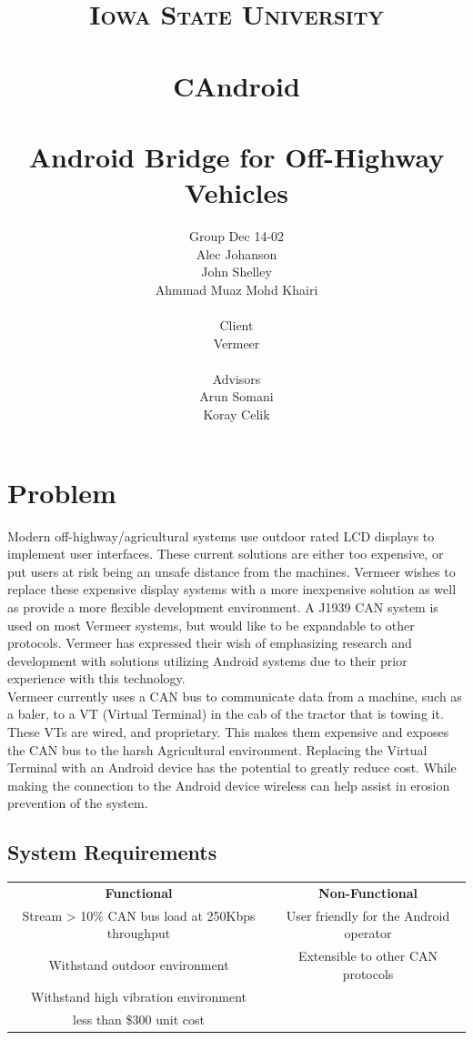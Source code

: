 \documentclass[paper=a4, fontsize=11pt]{scrartcl}
\title{
		\vspace{1in} 	
		\usefont{OT1}{bch}{b}{n}
		\normalfont \normalsize \textsc{Iowa State University} \\ [25pt]
		{\color{darkgreen}\horrule{1pt} \\[0.5cm]}
		\huge CAndroid \\
		{\color{darkgreen}\horrule{1pt} \\[0.5cm]}
		\large Android Bridge for Off-Highway Vehicles
		\vspace{1.25in}
}
\author{
		\normalfont 								\normalsize
		{\color{darkgreen} Group Dec 14-02}\\ \normalsize
        Alec Johanson\\[-3pt]		\normalsize
        John Shelley\\[-3pt]		\normalsize
        Ahmmad Muaz Mohd Khairi\\[-3pt]		\normalsize
		\\ \normalsize
		{\color{darkgreen} Client}\\ \normalsize
		Vermeer \\ \normalsize
		\\ \normalsize
		{\color{darkgreen} Advisors}\\ \normalsize
		Arun Somani \\ \normalsize
		Koray Celik \\ \normalsize
}
\date{}
\numberwithin{equation}{section}		%
\numberwithin{figure}{section}			%
\numberwithin{table}{section}				%
\begin{document}
\maketitle
\pagebreak
\tableofcontents
\pagebreak
\section{Problem}
Modern off-highway/agricultural systems use outdoor rated LCD displays to implement user interfaces. These current solutions are either too expensive, or put users at risk being an unsafe distance from the machines. Vermeer wishes to replace these expensive display systems with a more inexpensive solution as well as provide a more flexible development environment. A J1939 CAN system is used on most Vermeer systems, but would like to be expandable to other protocols. Vermeer has expressed their wish of emphasizing research and development with solutions utilizing Android systems due to their prior experience with this technology. \\

Vermeer currently uses a CAN bus to communicate data from a machine, such as a baler, to a VT (Virtual Terminal) in the cab of the tractor that is towing it. These VTs are wired, and proprietary. This makes them expensive and exposes the CAN bus to the harsh Agricultural environment. Replacing the Virtual Terminal with an Android device has the potential to greatly reduce cost. While making the connection to the Android device wireless can help assist in erosion prevention of the system. \\

\subsection{System Requirements}
\vspace{10pt}
\begin{tabular}{c | c}
	\textbf{Functional} & \textbf{Non-Functional} \\ [2ex]
	Stream > 10\%  CAN bus load at 250Kbps throughput & User friendly for the Android operator \\ [1ex]
	Withstand outdoor environment & Extensible to other CAN protocols \\ [1ex]
	Withstand high vibration environment & \\ [1ex]
	less than \$300 unit cost & \\ [1ex]
\end{tabular}
\end{document}
